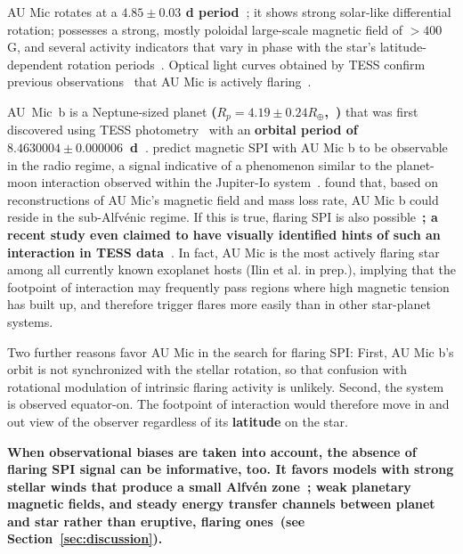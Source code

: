 \documentclass[fleqn,usenatbib]{mnras}%
\begin{document}
AU Mic rotates at a \textbf{$4.85\pm0.03$ d period~\citep{gilbert2021flares}}; it shows strong solar-like differential rotation; possesses a strong, mostly poloidal large-scale magnetic field of $>400$ G, and several activity indicators that vary in phase with the star's latitude-dependent rotation periods~\citep{klein2021}. Optical light curves obtained by TESS confirm previous observations~\citep{katsova1999, robinson2001, redfield2002} that AU Mic is actively flaring~\citep{martioli2021new}.

\mbox{AU Mic b} is a Neptune-sized planet \textbf{(\mbox{$R_p = 4.19\pm0.24R_\oplus$},~\citealt{gilbert2021flares})} that was first discovered using TESS photometry~\citep{plavchan2020} with an \textbf{orbital period of \mbox{$8.4630004\pm0.000006$ d}~\citep{gilbert2021flares}}. 
\citet{kavanagh2021} predict magnetic SPI with AU Mic b to be observable in the radio regime, a signal indicative of a phenomenon similar to the planet-moon interaction observed within the Jupiter-Io system~\citep{saur2013magnetic}. \citet{kavanagh2021} found that, based on reconstructions of AU Mic's magnetic field and mass loss rate, AU Mic b could reside in the sub-Alfv\'enic regime. If this is true, flaring SPI is also possible~\citep{lanza2018close-by}\textbf{; a recent study even claimed to have visually identified hints of such an interaction in TESS data~\cite{colombo2022short}}. In fact, AU Mic is the most actively flaring star among all currently known exoplanet hosts (Ilin et al. in prep.), implying that the footpoint of interaction may frequently pass regions where high magnetic tension has built up, and therefore trigger flares more easily than in other star-planet systems. 

Two further reasons favor AU Mic in the search for flaring SPI: First, AU Mic b's orbit is not synchronized with the stellar rotation, so that confusion with rotational modulation of intrinsic flaring activity is unlikely. Second, the system is observed equator-on. The footpoint of interaction would therefore move in and out view of the observer regardless of its \textbf{latitude} on the star.

\textbf{When observational biases are taken into account, the absence of flaring SPI signal can be informative, too. It favors models with strong stellar winds that produce a small Alfv\'en zone~\citep{kavanagh2021}; weak planetary magnetic fields, and steady energy transfer channels between planet and star rather than eruptive, flaring ones~(see Section~\ref{sec:discussion}).}  
\end{document}
